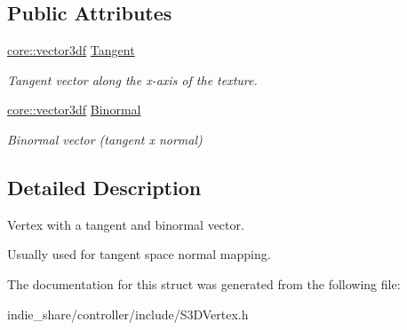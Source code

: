\subsection*{Public Attributes}
\begin{DoxyCompactItemize}
\item 
\mbox{\label{structirr_1_1video_1_1S3DVertexTangents_a485fefe522b906ad5ba161e0a2c78250}} 
\hyperlink{namespaceirr_1_1core_ae6e2b2a6c552833ebbd5b7463d03586b}{core\+::vector3df} \hyperlink{structirr_1_1video_1_1S3DVertexTangents_a485fefe522b906ad5ba161e0a2c78250}{Tangent}
\begin{DoxyCompactList}\small\item\em Tangent vector along the x-\/axis of the texture. \end{DoxyCompactList}\item 
\mbox{\label{structirr_1_1video_1_1S3DVertexTangents_a1bbf1a06b343e7d477f6f31467d790ca}} 
\hyperlink{namespaceirr_1_1core_ae6e2b2a6c552833ebbd5b7463d03586b}{core\+::vector3df} \hyperlink{structirr_1_1video_1_1S3DVertexTangents_a1bbf1a06b343e7d477f6f31467d790ca}{Binormal}
\begin{DoxyCompactList}\small\item\em Binormal vector (tangent x normal) \end{DoxyCompactList}\end{DoxyCompactItemize}


\subsection{Detailed Description}
Vertex with a tangent and binormal vector. 

Usually used for tangent space normal mapping. 

The documentation for this struct was generated from the following file\+:\begin{DoxyCompactItemize}
\item 
indie\+\_\+share/controller/include/S3\+D\+Vertex.\+h\end{DoxyCompactItemize}

